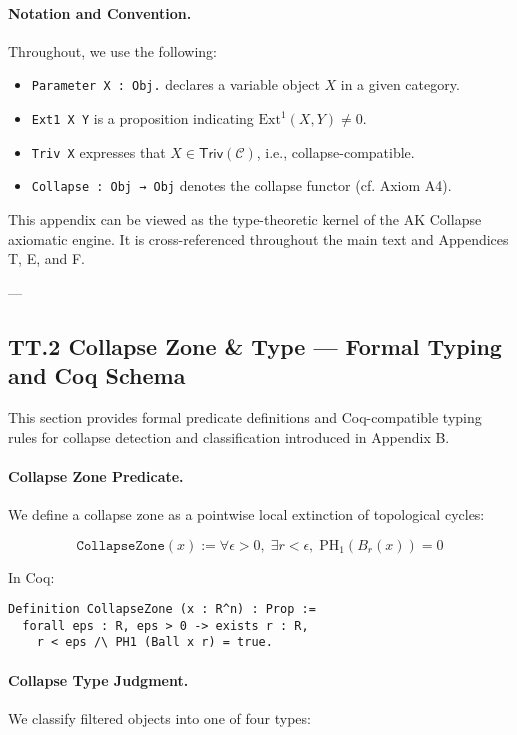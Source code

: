 \documentclass[11pt]{article}
\begin{document}
{\paragraph{Notation and Convention.}  
Throughout, we use the following:
\begin{itemize}
  \item \texttt{Parameter X : Obj.} declares a variable object \( X \) in a given category.
  \item \texttt{Ext1 X Y} is a proposition indicating \( \mathrm{Ext}^1(X,Y) \neq 0 \).
  \item \texttt{Triv X} expresses that \( X \in \mathsf{Triv}(\mathcal{C}) \), i.e., collapse-compatible.
  \item \texttt{Collapse : Obj → Obj} denotes the collapse functor (cf. Axiom A4).
\end{itemize}

This appendix can be viewed as the type-theoretic kernel of the AK Collapse axiomatic engine.  
It is cross-referenced throughout the main text and Appendices T, E, and F.

---

\subsection*{TT.2 Collapse Zone \& Type — Formal Typing and Coq Schema}

This section provides formal predicate definitions and Coq-compatible typing rules  
for collapse detection and classification introduced in Appendix B.

\paragraph{Collapse Zone Predicate.}
We define a collapse zone as a pointwise local extinction of topological cycles:

\[
\texttt{CollapseZone}(x) := \forall \epsilon > 0,\; \exists r < \epsilon,\; \mathrm{PH}_1(B_r(x)) = 0
\]

In Coq:
\begin{lstlisting}[language=Coq]
Definition CollapseZone (x : R^n) : Prop :=
  forall eps : R, eps > 0 -> exists r : R,
    r < eps /\ PH1 (Ball x r) = true.
\end{lstlisting}

\paragraph{Collapse Type Judgment.}
We classify filtered objects into one of four types:

}
\end{document}
